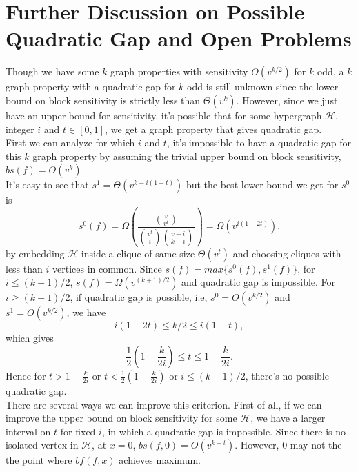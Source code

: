 \documentclass[psamsfonts]{amsart}
\theoremstyle{definition}
\theoremstyle{remark}
\numberwithin{equation}{section}
\begin{document}
	\section{Further Discussion on Possible Quadratic Gap and Open Problems}
		Though we have some $k$ graph properties with sensitivity $O(v^{k/2})$ for $k$ odd, a $k$ graph property with a quadratic gap for $k$ odd is still unknown since the lower bound on block sensitivity is strictly less than $\Theta(v^k)$. However, since we just have an upper bound for sensitivity, it's possible that for some hypergraph $\mathcal{H}$, integer $i$ and $t \in [0,1]$, we get a graph property that gives quadratic gap.\\ 
 \indent First we can analyze for which $i$ and $t$, it's impossible to have a quadratic gap for this $k$ graph property by assuming the trivial upper bound on block sensitivity, $bs(f) = O(v^k)$.\\
	\indent It's easy to see that $s^1 = \Theta(v^{k-i(1-t)})$ but the best lower bound we get for $s^0$ is 
	\begin{equation}
		s^0(f) = \Omega(\frac{{v \choose{v^t}}}{{v^t \choose{i}}{v-i \choose{k-i}}}) = \Omega(v^{i(1-2t)}). \nonumber
	\end{equation}
		by embedding $\mathcal{H}$ inside a clique of same size $\Theta(v^t)$ and choosing cliques with less than $i$ vertices in common. Since $s(f) = max \{ s^0(f), s^1(f) \}$, for $i \leq (k-1)/2$, $s(f) = \Omega(v^{(k+1)/2})$ and quadratic gap is impossible. For $i \geq (k+1)/2$, if quadratic gap is possible, i.e, $s^0 = O(v^{k/2})$ and $s^1 = O(v^{k/2})$, we have
		\begin{equation}
			i(1-2t) \leq k/2 \leq i(1-t),	\nonumber
		\end{equation}
		which gives
		\begin{equation}
			\frac{1}{2} (1- \frac{k}{2i}) \leq t \leq 1- \frac{k}{2i}. \nonumber
		\end{equation}
		Hence for $t > 1- \frac{k}{2i}$ or $t < \frac{1}{2} (1- \frac{k}{2i})$ or $i \leq (k-1)/2$, there's no possible quadratic gap.\\
		\indent There are several ways we can improve this criterion. First of all, if we can improve the upper bound on block sensitivity for some $\mathcal{H}$, we have a larger interval on $t$ for fixed $i$, in which a quadratic gap is impossible. Since there is no isolated vertex in $\mathcal{H}$, at $x=0$, $bs(f,0) = O(v^{k-t})$. However, $0$ may not the the point where $bf(f,x)$ achieves maximum.\\
\end{document}
